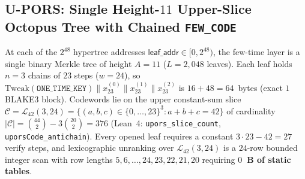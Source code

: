 \documentclass[11pt,a4paper]{article}
\theoremstyle{definition}
\theoremstyle{remark}
\newcommand{\UPORS}{\textsf{U-PORS}}
\newcommand{\BLAKE}{\textsf{BLAKE3}}
\newcommand{\Tweak}{\mathrm{Tweak}}
\newcommand{\calC}{\mathcal{C}}
\newcommand{\calL}{\mathcal{L}}
\begin{document}
\subsection{\UPORS{}: Single Height-$11$ Upper-Slice Octopus Tree with Chained \texttt{FEW\_CODE}}
\label{sec:upors}
At each of the $2^{48}$ hypertree addresses $\mathsf{leaf\_addr} \in [0, 2^{48})$, the few-time layer is a single binary Merkle tree of height $A = 11$ ($L = 2{,}048$ leaves). Each leaf holds $n = 3$ chains of $23$ steps ($w = 24$), so $\Tweak(\mathtt{ONE\_TIME\_KEY}) \parallel x_{23}^{(0)} \parallel x_{23}^{(1)} \parallel x_{23}^{(2)}$ is $16 + 48 = 64$~bytes (exact $1$ \BLAKE{} block). Codewords lie on the upper constant-sum slice $\calC = \calL_{42}(3, 24) = \{(a,b,c) \in \{0,\dots,23\}^3 : a+b+c = 42\}$ of cardinality $|\calC| = \binom{44}{2} - 3\binom{20}{2} = 376$ (Lean~4: \texttt{upors\_slice\_count}, \texttt{uporsCode\_antichain}). Every opened leaf requires a constant $3 \cdot 23 - 42 = 27$ verify steps, and lexicographic unranking over $\calL_{42}(3, 24)$ is a $24$-row bounded integer scan with row lengths $5, 6, \dots, 24, 23, 22, 21, 20$ requiring \textbf{$0$~B of static tables}.
\end{document}
